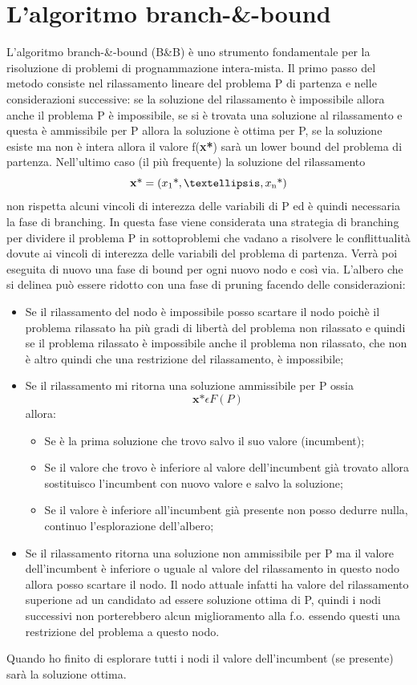 \documentclass[12pt,a4paper,twoside,openright]{book}
\begin{document}
\section{L'algoritmo branch-\&-bound}
L'algoritmo branch-\&-bound (B\&B) è uno strumento fondamentale per la risoluzione di problemi di 
prognammazione intera-mista. Il primo passo del metodo consiste nel rilassamento lineare del problema P di partenza e nelle considerazioni
successive: se la soluzione del rilassamento è impossibile allora anche il problema P è impossibile, 
se si è trovata una soluzione al rilassamento e questa è ammissibile per P allora la 
soluzione è ottima per P, se la soluzione esiste ma non è intera allora il valore f(\textbf{x\textup{*}}) 
sarà un lower bound del problema di partenza.
Nell’ultimo caso (il più frequente) la soluzione del rilassamento \[\textbf{x}\textup{*} = 
(x \textsubscript{1} \textup{*}, …, x\textsubscript{n} \textup{*})\] non rispetta alcuni 
vincoli di interezza delle variabili di P ed è quindi necessaria la fase di branching.
In questa fase viene considerata una strategia di branching per dividere il problema P 
in sottoproblemi che vadano a risolvere le conflittualità dovute ai vincoli di interezza 
delle variabili del problema di partenza. Verrà poi eseguita di nuovo una 
fase di bound per ogni nuovo nodo e così via.
L’albero che si delinea può essere ridotto con una fase di pruning facendo delle 
considerazioni:
\begin{itemize}
    \item Se il rilassamento del nodo è impossibile posso scartare il nodo poichè
        il problema rilassato ha più gradi di libertà del problema non rilassato e
        quindi se il problema rilassato è impossibile anche il problema non rilassato, che
        non è altro quindi che una restrizione del rilassamento, è impossibile;
    \item Se il rilassamento mi ritorna una soluzione ammissibile per P ossia 
    \[\textbf{x*} \epsilon F(P)\] allora:
        \begin{itemize}
            \item Se è la prima soluzione che trovo salvo il suo valore (incumbent);
            \item Se il valore che trovo è inferiore al valore dell’incumbent già 
                trovato allora sostituisco l’incumbent con nuovo valore e salvo la 
                soluzione;
            \item Se il valore è inferiore all'incumbent già presente non posso dedurre nulla,
                continuo l'esplorazione dell'albero;
        \end{itemize}
    \item Se il rilassamento ritorna una soluzione non ammissibile per P ma il valore 
        dell’incumbent è inferiore o uguale al valore del rilassamento in questo nodo allora posso
        scartare il nodo. Il nodo attuale infatti ha valore del rilassamento superione ad un
        candidato ad essere soluzione ottima di P, quindi i nodi successivi non porterebbero 
        alcun miglioramento alla f.o. essendo questi una restrizione del problema a questo nodo. 
\end{itemize}
Quando ho finito di esplorare tutti i nodi il valore dell’incumbent (se presente) sarà la soluzione ottima.
\end{document}
